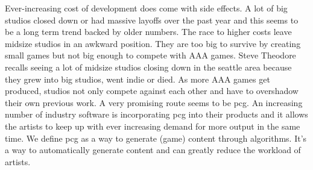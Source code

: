 \documentclass[10pt,a4paper]{article}
\begin{document}
\begin{multicols}{2}
Ever-increasing cost of development does come with side effects. A lot of big studios closed down or had massive layoffs over the past year \cite{Lahti2018, Schreier2019, Walker2019, Schreier2019a} and this seems to be a long term trend backed by older numbers\cite{Plunkett2012}. The race to higher costs leave midsize studios in an awkward position. They are too big to survive by creating small games but not big enough to compete with AAA games. Steve Theodore recalls seeing a lot of midsize studios closing down in the seattle area because they grew into big studios, went indie or died\cite{Prinke2017}. As more AAA games get produced, studios not only compete against each other and have to overshadow their own previous work. A very promising route seems to be \gls{pcg}. An increasing number of industry software is incorporating \gls{pcg} into their products and it allows the artists to keep up with ever increasing demand for more output in the same time. We define \gls{pcg} as a way to generate (game) content through algorithms. It’s a way to automatically generate content and can greatly reduce the workload of artists.
\end{multicols}
\end{document}
